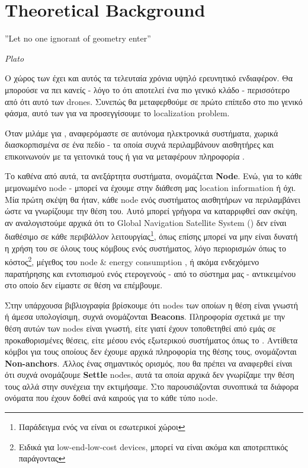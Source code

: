 \chapter{Theoretical Background} %
\label{chap:Chapter3} %
\epigraph{''Let no one ignorant of geometry enter” }{\textit{Plato}}

O χώρος των  έχει και αυτός τα τελευταία χρόνια υψηλό ερευνητικό ενδιαφέρον.
Θα μπορούσε να πει κανείς - λόγο το ότι αποτελεί ένα πιο γενικό κλάδο - περισσότερο από ότι αυτό των 
drones. Συνεπώς θα μεταφερθούμε σε πρώτο επίπεδο στο πιο γενικό φάσμα, αυτό των  
για να προσεγγίσουμε το localization problem. 

Όταν μιλάμε για , αναφερόμαστε σε αυτόνομα ηλεκτρονικά συστήματα, χωρικά διασκορπισμένα σε ένα πεδίο - τα οποία συχνά περιλαμβάνουν
αισθητήρες και επικοι\-νωνούν με τα γειτονικά τους ή  για να μεταφέρουν πληροφορία \cite{wsn-wikipedia} \cite{farooqiazam2016location}.

Το καθένα από αυτά, τα ανεξάρτητα συστήματα, ονομάζεται \textbf{Node}. Ενώ, για το κάθε μεμονωμένο node - 
μπορεί να έχουμε στην διάθεση μας location information ή όχι. 
Μία πρώτη σκέψη θα ήταν, κάθε node ενός συστήματος αισθητήρων να περιλαμβάνει  ώστε να γνωρίζουμε 
την θέση του. Αυτό μπορεί γρήγορα να καταρριφθεί σαν σκέψη, αν αναλογιστούμε αρχικά ότι το Global Navigation Satellite System ()
δεν είναι διαθέσιμο σε κάθε περιβάλλον λειτουργίας\footnote{Παράδειγμα ενός να είναι οι εσωτερικοί χώροι}, όπως επίσης μπορεί να μην είναι δυνατή η χρήση του σε όλους τους κόμβους
ενός συστήματος, λόγο περιορισμών όπως το κόστος\footnote{Ειδικά για low-end-low-cost devices, μπορεί να είναι ακόμα και αποτρεπτικός παράγοντας}, μέγεθος του node \& energy consumption \cite{farooqiazam2016location}, ή ακόμα ενδεχόμενο παρατήρησης
και εντοπισμού ενός ετερογενούς - από το σύστημα μας - αντικειμένου στο οποίο δεν είμαστε σε θέση να επέμβουμε.   

Στην υπάρχουσα βιβλιογραφία \cite{farooqiazam2016location} \cite{wsn-Localization-systems} \cite{wsn-Localization-techniques} βρίσκουμε ότι
nodes των οποίων η θέση είναι γνωστή ή άμεσα υπολογίσιμη, συχνά ονομάζονται \textbf{Beacons}. Πληροφορία σχετικά με την θέση αυτών
των nodes είναι γνωστή, είτε γιατί έχουν τοποθετηθεί από εμάς σε προκαθορισμένες θέσεις, είτε μέσου ενός εξωτερικού συστήματος
όπως το  \cite{angle-of-arrival}.
Αντίθετα κόμβοι για τους οποίους δεν έχουμε αρχικά πληροφορία της θέσης τους, ονομάζονται \textbf{Non-anchors}.
Άλλος ένας σημαντικός ορισμός, που θα πρέπει να αναφερθεί είναι ότι συχνά ονομάζουμε \textbf{Settle} nodes, 
αυτά τα οποία αρχικά δεν γνωρίζαμε την θέση τους αλλά στην συνέχεια την εκτιμήσαμε.
Στο  παρουσιάζονται συνοπτικά τα διάφορα ονόματα που έχουν δοθεί ανά 
καιρούς για το κάθε τύπο node.

